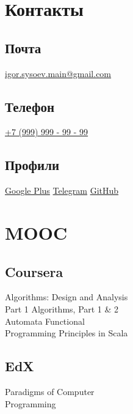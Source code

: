 \documentclass[a4paper]{curricula-vitae}
\begin{document}
\begin{minipage}[t]{0.33\textwidth}%

\section{Контакты} 

\subsection{Почта}
\href{mailto:igor.sysoev.main@gmail.com}{igor.sysoev.main@gmail.com}

\insertspace

\subsection{Телефон}
\href{tel:+79999999999}{+7 (999) 999 - 99 - 99}

\insertspace

\subsection{Профили}
\href{https://plus.google.com/+%D0%98%D0%B3%D0%BE%D1%80%D1%8C%D0%A1%D1%8B%D1%81%D0%BE%D0%B5%D0%B2}{Google Plus}
\textbullet{} \href{https://t.me/name}{Telegram}
\textbullet{} \href{https://github.com/ho-holic}{GitHub}

\insertspace

\section{MOOC}

\subsection{Coursera}
Algorithms: Design and Analysis \\
Part 1 \textbullet{} Algorithms, Part 1 \& 2 \\ 
Automata \textbullet{} Functional \\
Programming Principles in Scala

\insertspace

\subsection{EdX}
Paradigms of Computer \\
Programming


\end{minipage}
\end{document}
